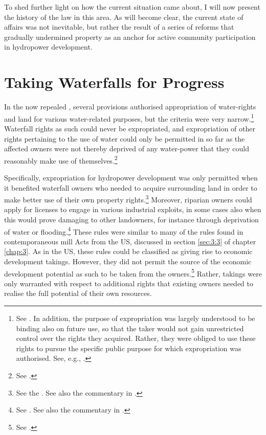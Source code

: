To shed further light on how the current situation came about, I will now present the history of the law in this area. As will become clear, the current state of affairs was not inevitable, but rather the result of a series of reforms that gradually undermined property as an anchor for active community participation in hydropower development.

\section{Taking Waterfalls for Progress}\label{sec:5:4}

In the now repealed \cite{wra88}, several provisions authorised appropriation of water-rights and land for various water-related purposes, but the criteria were very narrow.\footnote{See \cite[69-85]{dahl88}. In addition, the purpose of expropriation was largely understood to be binding also on future use, so that the taker would not gain unrestricted control over the rights they acquired. Rather, they were obliged to use these rights to pursue the specific public purpose for which expropriation was authorised. See, e.g., \cite[133-140]{rygh12}.} Waterfall rights as such could never be expropriated, and expropriation of other rights pertaining to the use of water could only be permitted in so far as the affected owners were not thereby deprived of any water-power that they could reasonably make use of themselves.\footnote{See \cite[58|60]{dahl88}.}

Specifically, expropriation for hydropower development was only permitted when it benefited waterfall owners who needed to acquire surrounding land in order to make better use of their own property rights.\footnote{See the \dni\cite[15, 16]{wra88}. See also the commentary in \cite[60-65]{dahl88}.} Moreover, riparian owners could apply for licenses to engage in various industrial exploits, in some cases also when this would prove damaging to other landowners, for instance through deprivation of water or flooding.\footnote{See \dni\cite[14]{wra88}. See also the commentary in \cite[54-60]{dahl88}.} These rules were similar to many of the rules found in contemporaneous mill Acts from the US, discussed in section \ref{sec:3:3} of chapter \ref{chap:3}. As in the US, these rules could be classified as giving rise to economic development takings. However, they did not permit the source of the economic development potential as such to be taken from the owners.\footnote{See \cite[168-170]{dahl88}.} Rather, takings were only warranted with respect to additional rights that existing owners needed to realise the full potential of their own resources.

